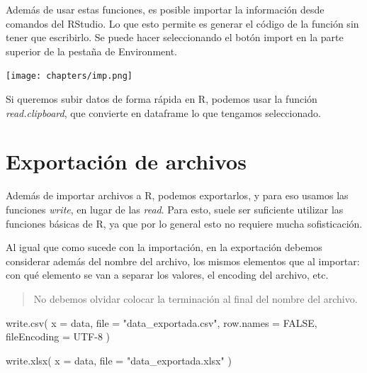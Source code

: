 \documentclass[
  letterpaper,
  DIV=11,
  numbers=noendperiod]{scrreprt}
\newenvironment{Shaded}{\begin{snugshade}}{\end{snugshade}}
\newcommand{\AttributeTok}[1]{\textcolor[rgb]{0.40,0.45,0.13}{#1}}
\newcommand{\ConstantTok}[1]{\textcolor[rgb]{0.56,0.35,0.01}{#1}}
\newcommand{\FunctionTok}[1]{\textcolor[rgb]{0.28,0.35,0.67}{#1}}
\newcommand{\NormalTok}[1]{\textcolor[rgb]{0.00,0.23,0.31}{#1}}
\newcommand{\StringTok}[1]{\textcolor[rgb]{0.13,0.47,0.30}{#1}}
\begin{document}
Además de usar estas funciones, es posible importar la información desde
comandos del RStudio. Lo que esto permite es generar el código de la
función sin tener que escribirlo. Se puede hacer seleccionando el botón
import en la parte superior de la pestaña de Environment.

\texttt{[image: chapters/imp.png]}

Si queremos subir datos de forma rápida en R, podemos usar la función
\emph{read.clipboard}, que convierte en dataframe lo que tengamos
seleccionado.

\hypertarget{exportaciuxf3n-de-archivos}{%
\section{Exportación de archivos}\label{exportaciuxf3n-de-archivos}}

Además de importar archivos a R, podemos exportarlos, y para eso usamos
las funciones \emph{write}, en lugar de las \emph{read}. Para esto,
suele ser suficiente utilizar las funciones básicas de R, ya que por lo
general esto no requiere mucha sofisticación.

Al igual que como sucede con la importación, en la exportación debemos
considerar además del nombre del archivo, los mismos elementos que al
importar: con qué elemento se van a separar los valores, el encoding del
archivo, etc.

\begin{quote}
No debemos olvidar colocar la terminación al final del nombre del
archivo.
\end{quote}

\begin{Shaded}
\begin{Highlighting}[]
\FunctionTok{write.csv}\NormalTok{(}
  \AttributeTok{x =}\NormalTok{ data,}
  \AttributeTok{file =} \StringTok{"data\_exportada.csv"}\NormalTok{,}
  \AttributeTok{row.names =} \ConstantTok{FALSE}\NormalTok{,}
  \AttributeTok{fileEncoding =} \StringTok{\textquotesingle{}UTF{-}8\textquotesingle{}}
\NormalTok{)}
\end{Highlighting}
\end{Shaded}

\begin{Shaded}
\begin{Highlighting}[]
\FunctionTok{write.xlsx}\NormalTok{(}
  \AttributeTok{x =}\NormalTok{ data,}
  \AttributeTok{file =} \StringTok{"data\_exportada.xlsx"}
\NormalTok{)}
\end{Highlighting}
\end{Shaded}
\end{document}
